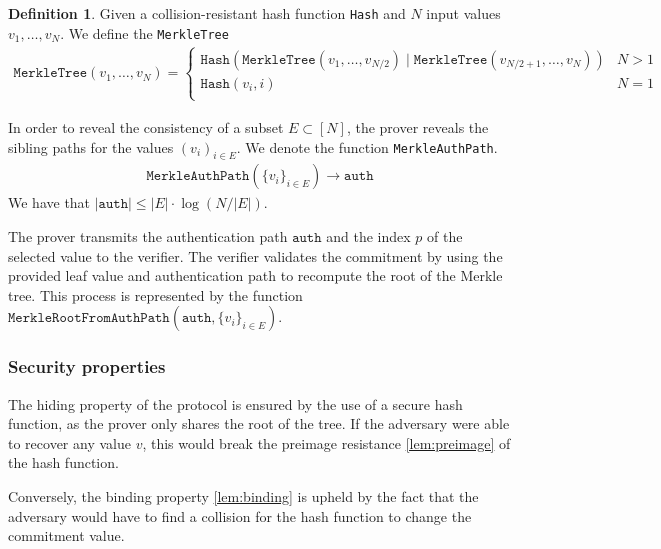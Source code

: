 \documentclass[11pt]{report}
\theoremstyle{definition}
\newtheorem{definition}{Definition}[section]
\theoremstyle{plain}
\begin{document}
\begin{definition}\label{def:merkle_tree}
  Given a collision-resistant hash function \texttt{Hash} and $N$ input values $v_1, \dots, v_N$. We define the \texttt{MerkleTree}
  {\small\begin{align*}
      \texttt{MerkleTree}(v_1, \dots, v_N) = \begin{cases}
                                               \texttt{Hash}(\texttt{MerkleTree}(v_1, \dots, v_{N/2}) \mid \texttt{MerkleTree}(v_{N/2+1}, \dots, v_N)) & N > 1 \\
                                               \texttt{Hash}(v_i, i)                                                                                   & N = 1 \\
                                             \end{cases}
    \end{align*}}%
\end{definition}

In order to reveal the consistency of a subset $E \subset [N]$, the prover reveals the sibling paths for the values $(v_i)_{i \in E}$. We denote the function \texttt{MerkleAuthPath}.
\begin{align*}
  \texttt{MerkleAuthPath}(\{v_i\}_{i \in E}) \rightarrow \texttt{auth}
\end{align*}
We have that $|\texttt{auth}| \leq |E| \cdot \log(N/|E|)$.

The prover transmits the authentication path $\texttt{auth}$ and the index $p$ of the selected value to the verifier. The verifier validates the commitment by using the provided leaf value and authentication path to recompute the root of the Merkle tree. This process is represented by the function $\texttt{MerkleRootFromAuthPath}(\texttt{auth}, \{v_i\}_{i \in E})$.

\subsubsection{Security properties}

The hiding property of the protocol is ensured by the use of a secure hash function, as the prover only shares the root of the tree. If the adversary were able to recover any value $v$, this would break the preimage resistance \autoref{lem:preimage} of the hash function.

Conversely, the binding property \autoref{lem:binding} is upheld by the fact that the adversary would have to find a collision for the hash function to change the commitment value.
\end{document}
